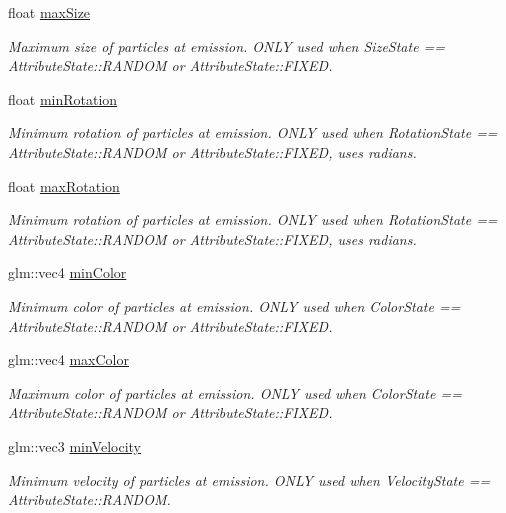 \begin{DoxyCompactItemize}
float \hyperlink{struct_mason_1_1_particle_emitter_config_ad8b8933ec9758ed264d1b1ccc3d24bd8}{max\+Size}
\begin{DoxyCompactList}\small\item\em Maximum size of particles at emission. O\+N\+LY used when Size\+State == Attribute\+State\+::\+R\+A\+N\+D\+OM or Attribute\+State\+::\+F\+I\+X\+ED. \end{DoxyCompactList}\item 
float \hyperlink{struct_mason_1_1_particle_emitter_config_ae6755b96da7af8b4c469b64f0887e186}{min\+Rotation}
\begin{DoxyCompactList}\small\item\em Minimum rotation of particles at emission. O\+N\+LY used when Rotation\+State == Attribute\+State\+::\+R\+A\+N\+D\+OM or Attribute\+State\+::\+F\+I\+X\+ED, uses radians. \end{DoxyCompactList}\item 
float \hyperlink{struct_mason_1_1_particle_emitter_config_a3a7e271bae699c0998a3d9ac73f3bb6f}{max\+Rotation}
\begin{DoxyCompactList}\small\item\em Minimum rotation of particles at emission. O\+N\+LY used when Rotation\+State == Attribute\+State\+::\+R\+A\+N\+D\+OM or Attribute\+State\+::\+F\+I\+X\+ED, uses radians. \end{DoxyCompactList}\item 
glm\+::vec4 \hyperlink{struct_mason_1_1_particle_emitter_config_aa70f6e44cc9712bf59ef89e1a339726d}{min\+Color}
\begin{DoxyCompactList}\small\item\em Minimum color of particles at emission. O\+N\+LY used when Color\+State == Attribute\+State\+::\+R\+A\+N\+D\+OM or Attribute\+State\+::\+F\+I\+X\+ED. \end{DoxyCompactList}\item 
glm\+::vec4 \hyperlink{struct_mason_1_1_particle_emitter_config_af48c8574b50e51408c3566f862e22dbd}{max\+Color}
\begin{DoxyCompactList}\small\item\em Maximum color of particles at emission. O\+N\+LY used when Color\+State == Attribute\+State\+::\+R\+A\+N\+D\+OM or Attribute\+State\+::\+F\+I\+X\+ED. \end{DoxyCompactList}\item 
glm\+::vec3 \hyperlink{struct_mason_1_1_particle_emitter_config_a3d8df085c0a91b61f42adc5eef888c79}{min\+Velocity}
\begin{DoxyCompactList}\small\item\em Minimum velocity of particles at emission. O\+N\+LY used when Velocity\+State == Attribute\+State\+::\+R\+A\+N\+D\+OM. \end{DoxyCompactList}\item 

\end{DoxyCompactItemize}
